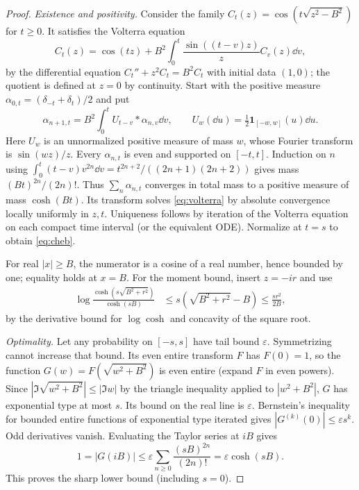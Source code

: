\documentclass[11pt]{article}
\theoremstyle{definition}\newtheorem{definition}[theorem]{Definition}
\begin{document}
\begin{proof}
\emph{Existence and positivity.} Consider the family $C_t(z)=\cos(t\sqrt{z^2-B^2})$ for $t\ge0$. It satisfies the Volterra equation
\begin{equation}\label{eq:volterra}
 C_t(z)=\cos(tz)+B^2\int_0^t\frac{\sin((t-v)z)}{z}C_v(z)\dd v,
\end{equation}
by the differential equation $C_t''+z^2 C_t=B^2 C_t$ with initial data $(1,0)$; the quotient is defined at $z=0$ by continuity. Start with the positive measure $\alpha_{0,t}=(\delta_{-t}+\delta_t)/2$ and put
\[
 \alpha_{n+1,t}=B^2\int_0^t U_{t-v}*\alpha_{n,v}\dd v,\qquad U_w(\dd u)=\tfrac12\mathbf1_{[-w,w]}(u)\dd u.
\]
Here $U_w$ is an unnormalized positive measure of mass $w$, whose Fourier transform is $\sin(wz)/z$. Every $\alpha_{n,t}$ is even and supported on $[-t,t]$. Induction on $n$ using $\int_0^t(t-v)v^{2n}\dd v=t^{2n+2}/((2n+1)(2n+2))$ gives mass $(Bt)^{2n}/(2n)!$. Thus $\sum_n\alpha_{n,t}$ converges in total mass to a positive measure of mass $\cosh(Bt)$. Its transform solves \eqref{eq:volterra} by absolute convergence locally uniformly in $z,t$. Uniqueness follows by iteration of the Volterra equation on each compact time interval (or the equivalent ODE). Normalize at $t=s$ to obtain \eqref{eq:cheb}.

For real $|x|\ge B$, the numerator is a cosine of a real number, hence bounded by one; equality holds at $x=B$. For the moment bound, insert $z=-ir$ and use
\begin{align*}
 \log\frac{\cosh(s\sqrt{B^2+r^2})}{\cosh(sB)}
 &\le s(\sqrt{B^2+r^2}-B)\le\frac{sr^2}{2B},
\end{align*}
by the derivative bound for $\log\cosh$ and concavity of the square root.

\emph{Optimality.} Let any probability on $[-s,s]$ have tail bound $\varepsilon$. Symmetrizing cannot increase that bound. Its even entire transform $F$ has $F(0)=1$, so the function $G(w)=F(\sqrt{w^2+B^2})$ is even entire (expand $F$ in even powers). Since $|\Im\sqrt{w^2+B^2}|\le|\Im w|$ by the triangle inequality applied to $|w^2+B^2|$, $G$ has exponential type at most $s$. Its bound on the real line is $\varepsilon$. Bernstein's inequality for bounded entire functions of exponential type \cite{bernstein} iterated gives $|G^{(k)}(0)|\le\varepsilon s^k$. Odd derivatives vanish. Evaluating the Taylor series at $iB$ gives
\[
 1=|G(iB)|\le\varepsilon\sum_{n\ge0}\frac{(sB)^{2n}}{(2n)!}=\varepsilon\cosh(sB).
\]
This proves the sharp lower bound (including $s=0$).
\end{proof}
\end{document}
